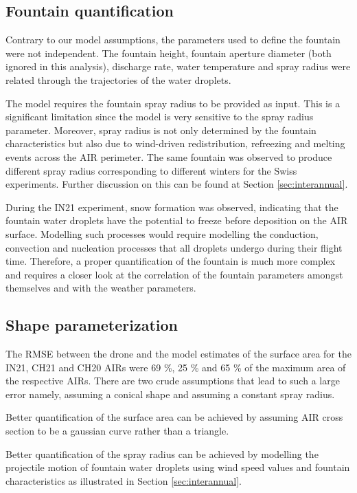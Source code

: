 \subsection{Fountain quantification}

Contrary to our model assumptions, the parameters used to define the fountain were not independent. The fountain
height, fountain aperture diameter (both ignored in this analysis), discharge rate, water temperature and spray
radius were related through the trajectories of the water droplets.  

The model requires the fountain spray radius to be provided as input. This is a significant limitation since the
model is very sensitive to the spray radius parameter. Moreover, spray radius is not only determined by the fountain
characteristics but also due to wind-driven redistribution, refreezing and melting events across the AIR
perimeter. The same fountain was observed to produce different spray radius corresponding to different winters
for the Swiss experiments. Further discussion on this can be found at Section \ref{sec:interannual}.

During the IN21 experiment, snow formation was observed, indicating that the fountain water droplets have the
potential to freeze before deposition on the AIR surface. Modelling such processes would require modelling the
conduction, convection and nucleation processes that all droplets undergo during their flight time. Therefore, a
proper quantification of the fountain is much more complex and requires a closer look at the correlation of the
fountain parameters amongst themselves and with the weather parameters. 

\subsection{Shape parameterization}

The RMSE between the drone and the model estimates of the surface area for the IN21, CH21 and CH20 \ac{AIRs} were 69
\%, 25 \% and 65 \% of the maximum area of the respective \ac{AIRs}. There are two crude assumptions that lead to
such a large error namely, assuming a conical shape and assuming a constant spray radius.

Better quantification of the surface area can be achieved by assuming AIR cross section to be a gaussian curve
rather than a triangle.

Better quantification of the spray radius can be achieved by modelling the projectile motion of fountain water
droplets using wind speed values and fountain characteristics as illustrated in Section \ref{sec:interannual}.


